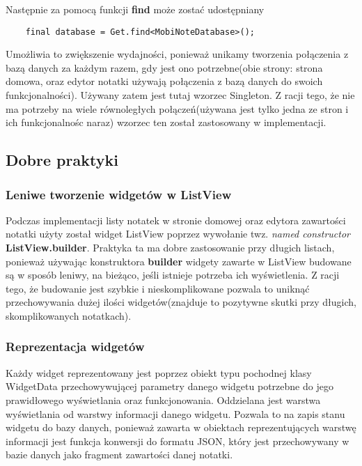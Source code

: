 \noindent Następnie za pomocą funkcji \textbf{find} może zostać udostępniany

\begin{verbatim}
    final database = Get.find<MobiNoteDatabase>();
\end{verbatim}

Umożliwia to zwiększenie wydajności, ponieważ unikamy tworzenia połączenia z bazą danych za każdym razem, gdy jest ono potrzebne(obie strony: strona domowa, oraz edytor notatki używają połączenia z bazą danych do swoich funkcjonalności). Używany zatem jest tutaj wzorzec Singleton. Z racji tego, że nie ma potrzeby na wiele równoległych połączeń(używana  jest tylko jedna ze stron i ich funkcjonalnośc naraz) wzorzec ten został zastosowany w implementacji.

\subsection{Dobre praktyki}

\subsubsection{Leniwe tworzenie widgetów w ListView}

Podczas implementacji listy notatek w stronie domowej oraz edytora zawartości notatki użyty został widget ListView poprzez wywołanie twz. \textit{named constructor} \textbf{ListView.builder}. Praktyka ta ma dobre zastosowanie przy długich listach, ponieważ używając konstruktora \textbf{builder} widgety zawarte w ListView budowane są w sposób leniwy, na bieżąco, jeśli istnieje potrzeba ich wyświetlenia. Z racji tego, że budowanie jest szybkie i nieskomplikowane pozwala to uniknąć przechowywania dużej ilości widgetów(znajduje to pozytywne skutki przy długich, skomplikowanych notatkach).

\subsubsection{Reprezentacja widgetów}

Każdy widget reprezentowany jest poprzez obiekt typu pochodnej klasy WidgetData przechowywującej parametry danego widgetu potrzebne do jego prawidłowego wyświetlania oraz funkcjonowania. Oddzielana jest warstwa wyświetlania od warstwy informacji danego widgetu. Pozwala to na zapis stanu widgetu do bazy danych, ponieważ zawarta w obiektach reprezentujących warstwę informacji jest funkcja konwersji do formatu JSON, który jest przechowywany w bazie danych jako fragment zawartości danej notatki.

